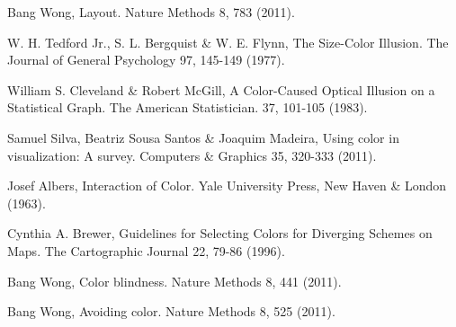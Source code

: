 \documentclass[letterpaper]{article}\usepackage[]{graphicx}\usepackage[]{color}
\begin{document}
\begin{thebibliography}{1}
Bang Wong, Layout. Nature Methods 8, 783 (2011).

W. H. Tedford Jr., S. L. Bergquist \& W. E. Flynn, The Size-Color Illusion. The Journal of General Psychology 97, 145-149 (1977).

William S. Cleveland \& Robert McGill, A Color-Caused Optical Illusion on a Statistical Graph. The American Statistician. 37, 101-105 (1983).

Samuel Silva, Beatriz Sousa Santos \& Joaquim Madeira, Using color in visualization: A survey. Computers \& Graphics 35, 320-333 (2011).

Josef Albers, Interaction of Color. Yale University Press, New Haven \& London (1963).

Cynthia A. Brewer, Guidelines for Selecting Colors for Diverging Schemes on Maps. The Cartographic Journal 22, 79-86 (1996).

Bang Wong, Color blindness. Nature Methods 8, 441 (2011).

Bang Wong, Avoiding color. Nature Methods 8, 525 (2011).

\end{thebibliography}
\end{document}
